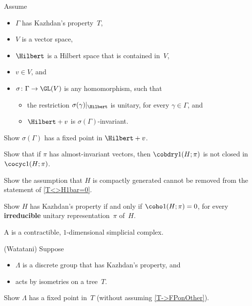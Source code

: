 \begin{exercises}
\item Assume
 \begin{itemize}
 \item $\Gamma$ has Kazhdan's property~$T$,
 \item $V$ is a vector space,
 \item $\Hilbert$ is a Hilbert space that is contained in~$V$,
 \item $v \in V$,
 and
 \item $\sigma \colon \Gamma \to \GL(V)$ is any homomorphism, such
that 
 \begin{itemize}
 \item the restriction $\sigma(\gamma)|_{\Hilbert}$ is unitary, for
every $\gamma \in \Gamma$, 
 and
 \item $\Hilbert + v$ is $\sigma(\Gamma)$-invariant.
 \end{itemize}
 \end{itemize}
 Show $\sigma(\Gamma)$ has a fixed point in $\Hilbert + v$.
 
 \item \label{AlmInvt->B1NotClosed}
 Show that if $\pi$ has almost-invariant vectors, then $\cobdry1(H;\pi)$ is not closed in $\cocyc1(H;\pi)$.
 
 \item \label{RedCohoCpctGenEx}
 Show the assumption that $H$ is compactly generated cannot be removed from the statement of \cref{T<>H1bar=0}.
 
 \item \label{TiffH1(irred)}
 Show $H$ has Kazhdan's property if and only if 
 $\coho1(H; \pi) = 0$, for every \textbf{irreducible} unitary
representation~$\pi$ of~$H$.

\begin{defn*}
A  is a contractible, $1$-dimensional simplicial complex.
\end{defn*}

\item  \label{WatataniThm}
(Watatani)
Suppose 
	\begin{itemize}
	\item $\Lambda$ is a discrete group that has Kazhdan's property, 
	and 
	\item acts by isometries on a tree~$T$. 
	\end{itemize}
Show $\Lambda$ has a fixed point in~$T$ (without assuming \cref{T->FPonOther}). 


\end{exercises}
